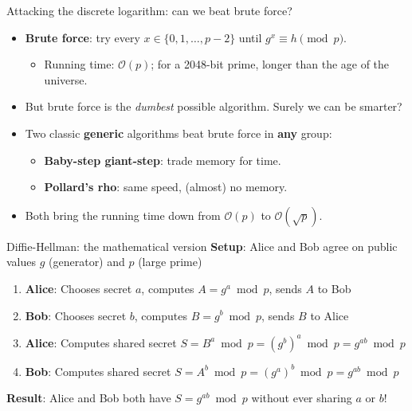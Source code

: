 \ifdefined\PRESENTATION\else\PassOptionsToClass{handout}{beamer}\fi\documentclass[aspectratio=169, lualatex]{beamer}
\begin{document}
\begin{frame}{Attacking the discrete logarithm: can we beat brute force?}
	\begin{itemize}[<+->]
		\item \textbf{Brute force}: try every $x \in \{0, 1, \ldots, p-2\}$ until $g^x \equiv h \pmod{p}$.
		      \begin{itemize}
			      \item Running time: $\mathcal{O}(p)$; for a 2048-bit prime, longer than the age of the universe.
		      \end{itemize}
		\item But brute force is the \textit{dumbest} possible algorithm. Surely we can be smarter?
		\item Two classic \textbf{generic} algorithms beat brute force in \textbf{any} group:
		      \begin{itemize}
			      \item \textbf{Baby-step giant-step}: trade memory for time.
			      \item \textbf{Pollard's rho}: same speed, (almost) no memory.
		      \end{itemize}
		\item Both bring the running time down from $\mathcal{O}(p)$ to $\mathcal{O}(\sqrt{p})$.
	\end{itemize}
\end{frame}

\begin{frame}{Diffie-Hellman: the mathematical version}
	\textbf{Setup}: Alice and Bob agree on public values $g$ (generator) and $p$ (large prime)
	\vspace{0.5cm}
	\begin{enumerate}[<+->]
		\item \textbf{Alice}: Chooses secret $a$, computes $A = g^a \bmod p$, sends $A$ to Bob
		\item \textbf{Bob}: Chooses secret $b$, computes $B = g^b \bmod p$, sends $B$ to Alice
		\item \textbf{Alice}: Computes shared secret $S = B^a \bmod p = (g^b)^a \bmod p = g^{ab} \bmod p$
		\item \textbf{Bob}: Computes shared secret $S = A^b \bmod p = (g^a)^b \bmod p = g^{ab} \bmod p$
	\end{enumerate}
	\vspace{0.5cm}
	\textbf{Result}: Alice and Bob both have $S = g^{ab} \bmod p$ without ever sharing $a$ or $b$!
\end{frame}
\end{document}
